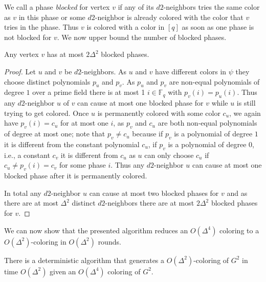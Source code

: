 We call a phase \emph{blocked} for vertex $v$ if any of its $d2$-neighbors tries the same color as $v$ in this phase or some $d2$-neighbor is already colored with the color that $v$ tries in the phase. Thus $v$ is colored with a color in $[q]$ as soon as one phase is not blocked for $v$. We now upper bound the number of blocked phases.
\begin{lemma}
\label{lem:blockedPhases}
 Any vertex $v$ has at most $2\Delta^2$ blocked phases. 
\end{lemma}
\begin{proof}
Let $u$ and $v$ be $d2$-neighbors. As $u$ and $v$ have different colors in $\psi$ they choose distinct polynomials $p_u$ and $p_v$. As $p_u$ and $p_v$ are non-equal polynomials of degree $1$ over a prime field there is at most 1 $i\in \mathbb{F}_q$ with $p_v(i)=p_u(i)$. Thus any $d2$-neighbor $u$ of $v$ can cause at most one blocked phase for $v$ while $u$ is still trying to get colored. Once $u$ is permanently colored with some color $c_u$, we again have $p_v(i)=c_u$ for at most one $i$, as $p_v$ and $c_u$ are both non-equal polynomials of degree at most one; note that $p_v\neq c_u$ because if $p_v$ is a polynomial of degree $1$ it is different from the constant polynomial $c_u$, if $p_v$ is a polynomial of degree $0$, i.e., a constant $c_v$ it is different from $c_u$ as $u$ can only choose $c_u$ if $c_u\neq p_v(i)=c_v$ for some phase $i$.  Thus any $d2$-neighbor $u$ can cause at most one blocked phase after it is permanently colored. 

In total any $d2$-neighbor $u$ can cause at most two blocked phases for $v$ and as there are at most $\Delta^2$ distinct $d2$-neighbors there are at most $2\Delta^2$ blocked phases for $v$.
\end{proof}
We can now show that the presented algorithm reduces an $O(\Delta^4)$ coloring to a $O(\Delta^2)$-coloring in $O(\Delta^2)$ rounds. 

\begin{theorem}
\label{thm:d2ColoringDelta}
There is a deterministic \congest algorithm that generates a $O(\Delta^2)$-coloring of $G^2$ in time $O(\Delta^2)$ given an $O(\Delta^4)$ coloring of $G^2$.
\end{theorem}

